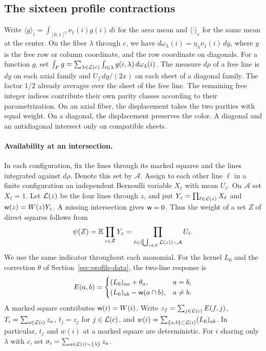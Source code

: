 \subsection{The sixteen profile contractions}\label{sec:contracciones} Write \(\langle
g\rangle_i=\int_{[0,1]^2}\nu_1(i)g(i)\,di\) for the area mean and \(\langle\cdot\rangle_c\) for the same
mean at the center. On the fiber \(\lambda\) through \(c\), we have
\(d\omega_\lambda(i)=\eta_\lambda\nu_1(i)\,dy\), where \(y\) is the free row or column coordinate, and
the row coordinate on diagonals. For a function \(g\), set \(\int_F g=\sum_{\lambda\in
\mathcal L(c)}\int_{i\in\lambda}g(i,\lambda)\,d\omega_\lambda(i)\). The measure \(d\rho\) of a free line
is \(dy\) on each axial family and \(U_f\,dy/(2x)\) on each sheet of a diagonal family. The factor
\(1/2\) already averages over the sheet of the free line. The remaining free integer indices contribute
their own parity classes according to their parametrization. On an axial fiber, the displacement takes
the two parities with equal weight. On a diagonal, the displacement preserves the color. A diagonal and
an antidiagonal intersect only on compatible sheets.

\paragraph{Availability at an intersection.} In each configuration, fix the lines through its marked
squares and the lines integrated against \(d\rho\). Denote this set by \(\mathcal A\). Assign to each
other line \(\ell\) in a finite configuration an independent Bernoulli variable \(X_\ell\) with mean
\(U_\ell\). On \(\mathcal A\) set \(X_\ell=1\). Let \(\mathcal L(z)\) be the four lines through \(z\), and
put \(Y_z=\prod_{\ell\in \mathcal L(z)}X_\ell\) and \(\mathsf w(z)=W(z)Y_z\). A missing intersection
gives \(\mathsf w=0\). Thus the weight of a set \(Z\) of direct squares follows from \[
 \psi(Z)=\mathbb E\prod_{z\in Z}Y_z
 =\prod_{\ell\in(\bigcup_{z\in Z}\mathcal L(z))\smallsetminus\mathcal A}U_\ell .
\] We use the same indicator throughout each monomial. For the kernel \(L_0\) and the correction
\(\theta\) of Section~\ref{sec:profile-data}, the two-line response is \[
 E(a,b)=
 \begin{cases}
 (L_0)_{aa}+\theta_a,&a=b,\\
 (L_0)_{ab}-\mathsf w(a\cap b),&a\ne b .
 \end{cases}
\] A marked square contributes \(\mathsf w(i)=W(i)\). Write \(z_f=\sum_{j\in \mathcal L(c)}E(f,j)\),
\(T_i=\sum_{a\in \mathcal L(i)}z_a\), \(t_j=z_j\) for \(j\in \mathcal L(c)\), and
\(w(i)=\sum_{\{a,b\}\subset \mathcal L(i)}(L_0)_{ab}\). In particular, \(t_j\) and \(w(i)\) at a marked
square are deterministic. For \(i\) sharing only \(\lambda\) with \(c\), set \(\sigma_i=\sum_{a\in
\mathcal L(i)\smallsetminus\{\lambda\}}z_a\).

